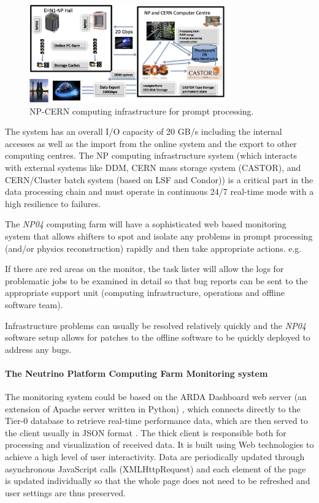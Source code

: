 \documentclass[pdftex,12pt,letter]{article}
\newcommand{\expname}{\textit{NP04}\xspace}
\begin{document}
\begin{figure}[tbh]
  \centering
  \includegraphics[width=0.75\textwidth]{figures/np04tzero.png}
  \caption{NP-CERN computing infrastructure for prompt processing.}
  \label{fig:npcomptzero}
\end{figure}

The system has an overall I/O capacity of 20 GB/s including the internal accesses as well as the import from the online system and the export to other computing centres. The NP computing infrastructure system (which interacts with external systems like DDM, CERN mass storage system (CASTOR), and  CERN/Cluster batch system (based on LSF and Condor))  is a critical part in the data processing chain and must operate in continuous 24/7 real-time mode with a high resilience to failures.

The \expname computing farm will have a sophisticated web based monitoring system that allows shifters to spot and isolate any problems in prompt processing (and/or physics reconstruction) rapidly and then take appropriate actions. e.g. 

If there are red areas on the monitor, the task lister will allow the logs for problematic jobs to be examined in detail so that bug reports can be sent to the appropriate support unit (computing infrastructure, operations and offline software team).

Infrastructure problems can usually be resolved relatively quickly and the \expname software setup allows for patches to the offline software to be quickly deployed to address any bugs.

\paragraph{The Neutrino Platform Computing Farm Monitoring system}
The monitoring system could be based on the ARDA Dashboard web server (an extension of Apache server written in Python) \cite{arda}, which connects directly to the Tier-0 database to retrieve real-time performance data, which are then served to the client usually in JSON format \cite{json}.
The thick client is responsible both for processing and visualization of received data. It is built using Web technologies to achieve a high level of user interactivity. Data are periodically updated through asynchronous JavaScript calls (XMLHttpRequest) \cite{XMLHttpRequest} and each element of the page is updated individually so that the whole page does not need to be refreshed and user settings are thus preserved.  
\end{document}
